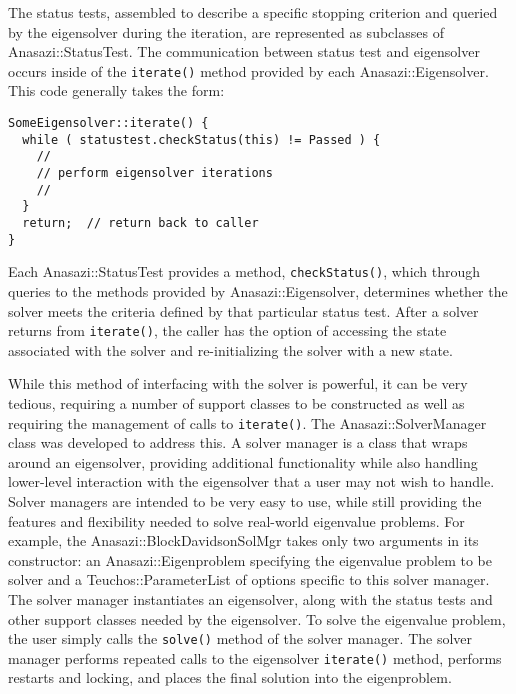 The status tests, assembled to describe a specific stopping criterion and queried by the eigensolver
during the iteration, are represented as subclasses of Anasazi::StatusTest. The
communication between status test and eigensolver occurs
inside of the \verb!iterate()! method provided by each Anasazi::Eigensolver. This code
generally takes the form:
\begin{verbatim}
SomeEigensolver::iterate() {
  while ( statustest.checkStatus(this) != Passed ) {
    //
    // perform eigensolver iterations
    //
  }
  return;  // return back to caller
}
\end{verbatim}

Each Anasazi::StatusTest provides a method, \verb!checkStatus()!, which through queries to
the methods provided by Anasazi::Eigensolver, determines whether the solver meets the
criteria defined by that particular status test. After a solver returns from
\verb!iterate()!, the caller has the option of accessing the state associated with the
solver and re-initializing the solver with a new state.

While this method of interfacing with the solver is powerful, it can be very tedious,
requiring a number of support classes to be constructed as well as requiring the
management of calls to \verb!iterate()!. The Anasazi::SolverManager class was developed to
address this. A solver manager is a class that wraps around an eigensolver,
providing additional functionality while also handling lower-level interaction with the
eigensolver that a user may not wish to handle. Solver managers are intended to be very
easy to use, while still providing the features and flexibility needed to solve real-world
eigenvalue problems. For example, the Anasazi::BlockDavidsonSolMgr takes only two
arguments in its constructor: an Anasazi::Eigenproblem specifying the eigenvalue problem
to be solver and a Teuchos::ParameterList of options specific to this solver manager. The
solver manager instantiates an eigensolver, along with the status tests and other support
classes needed by the eigensolver. To solve the eigenvalue problem, the user simply calls
the \verb!solve()! method of the solver manager. The solver manager performs repeated
calls to the eigensolver \verb!iterate()! method, performs restarts and locking, and
places the final solution into the eigenproblem.

